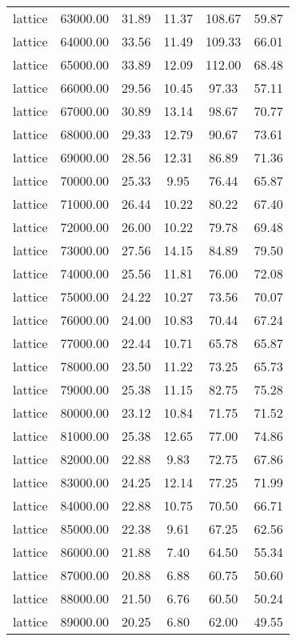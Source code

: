 \begin{table}[ht]
\begin{table}[ht]
\begin{tabular}{|cccccc}
  lattice & 63000.00 & 31.89 & 11.37 & 108.67 & 59.87 \\ 
  lattice & 64000.00 & 33.56 & 11.49 & 109.33 & 66.01 \\ 
  lattice & 65000.00 & 33.89 & 12.09 & 112.00 & 68.48 \\ 
  lattice & 66000.00 & 29.56 & 10.45 & 97.33 & 57.11 \\ 
  lattice & 67000.00 & 30.89 & 13.14 & 98.67 & 70.77 \\ 
  lattice & 68000.00 & 29.33 & 12.79 & 90.67 & 73.61 \\ 
  lattice & 69000.00 & 28.56 & 12.31 & 86.89 & 71.36 \\ 
  lattice & 70000.00 & 25.33 & 9.95 & 76.44 & 65.87 \\ 
  lattice & 71000.00 & 26.44 & 10.22 & 80.22 & 67.40 \\ 
  lattice & 72000.00 & 26.00 & 10.22 & 79.78 & 69.48 \\ 
  lattice & 73000.00 & 27.56 & 14.15 & 84.89 & 79.50 \\ 
  lattice & 74000.00 & 25.56 & 11.81 & 76.00 & 72.08 \\ 
  lattice & 75000.00 & 24.22 & 10.27 & 73.56 & 70.07 \\ 
  lattice & 76000.00 & 24.00 & 10.83 & 70.44 & 67.24 \\ 
  lattice & 77000.00 & 22.44 & 10.71 & 65.78 & 65.87 \\ 
  lattice & 78000.00 & 23.50 & 11.22 & 73.25 & 65.73 \\ 
  lattice & 79000.00 & 25.38 & 11.15 & 82.75 & 75.28 \\ 
  lattice & 80000.00 & 23.12 & 10.84 & 71.75 & 71.52 \\ 
  lattice & 81000.00 & 25.38 & 12.65 & 77.00 & 74.86 \\ 
  lattice & 82000.00 & 22.88 & 9.83 & 72.75 & 67.86 \\ 
  lattice & 83000.00 & 24.25 & 12.14 & 77.25 & 71.99 \\ 
  lattice & 84000.00 & 22.88 & 10.75 & 70.50 & 66.71 \\ 
  lattice & 85000.00 & 22.38 & 9.61 & 67.25 & 62.56 \\ 
  lattice & 86000.00 & 21.88 & 7.40 & 64.50 & 55.34 \\ 
  lattice & 87000.00 & 20.88 & 6.88 & 60.75 & 50.60 \\ 
  lattice & 88000.00 & 21.50 & 6.76 & 60.50 & 50.24 \\ 
  lattice & 89000.00 & 20.25 & 6.80 & 62.00 & 49.55 \\ 

\end{tabular}
\end{table}
\end{table}

